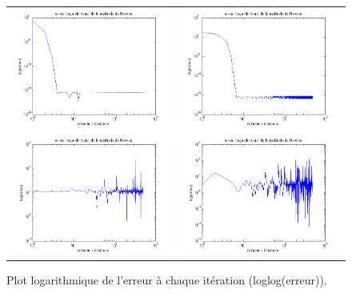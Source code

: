 \begin{figure}
\centering
\begin{tabular}{cc}
\includegraphics[width = 8cm]{erreur2.png} & \includegraphics[width = 8cm]{erreur5.png}\\
\includegraphics[width = 8cm]{erreur.png} & \includegraphics[width = 8cm]{erreur4.png}\\
\end{tabular}
\caption{Plot logarithmique de l'erreur à chaque itération (loglog(erreur)). }
\label{plor_erreur}
\end{figure}




